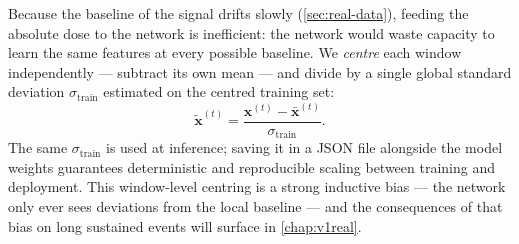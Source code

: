 Because the baseline of the signal drifts slowly
(\cref{sec:real-data}), feeding the absolute dose to the network is
inefficient: the network would waste capacity to learn the same
features at every possible baseline. We \emph{centre} each window
independently --- subtract its own mean --- and divide by a single
global standard deviation $\sigma_{\text{train}}$ estimated on the
centred training set:
\begin{equation}
    \tilde{\mathbf{x}}^{(t)} = \frac{\mathbf{x}^{(t)} - \bar{\mathbf{x}}^{(t)}}{\sigma_{\text{train}}}.
    \label{eq:window-norm}
\end{equation}
The same $\sigma_{\text{train}}$ is used at inference; saving it in a
JSON file alongside the model weights guarantees deterministic and
reproducible scaling between training and deployment. This window-level
centring is a strong inductive bias --- the network only ever sees
deviations from the local baseline --- and the consequences of that
bias on long sustained events will surface in \cref{chap:v1real}.
